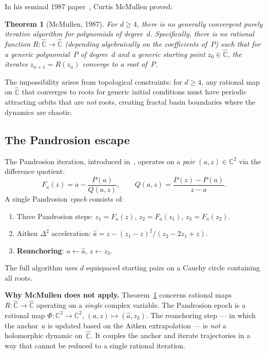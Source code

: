 \documentclass[10pt,a4paper,oneside]{book}
\newtheorem{theorem}{Theorem}[chapter]
\theoremstyle{definition}
\theoremstyle{remark}
\begin{document}
In his seminal 1987 paper~\cite{McMullen1987}, Curtis McMullen proved:

\begin{theorem}[McMullen, 1987]
\label{thm:mcmullen}
For $d \geq 4$, there is no generally convergent purely iterative algorithm for polynomials of degree~$d$.  Specifically, there is no rational function $R: \hat{\mathbb{C}} \to \hat{\mathbb{C}}$ (depending algebraically on the coefficients of~$P$) such that for a generic polynomial~$P$ of degree~$d$ and a generic starting point $z_0 \in \hat{\mathbb{C}}$, the iterates $z_{n+1} = R(z_n)$ converge to a root of~$P$.
\end{theorem}

The impossibility arises from topological constraints: for $d \geq 4$, any rational map on $\hat{\mathbb{C}}$ that converges to roots for generic initial conditions must have periodic attracting orbits that are \emph{not} roots, creating fractal basin boundaries where the dynamics are chaotic.

\subsection{The Pandrosion escape}

The Pandrosion iteration, introduced in~\cite{Besevic2026a}, operates on a \emph{pair} $(a, z) \in \mathbb{C}^2$ via the difference quotient:
\[
F_a(z) = a - \frac{P(a)}{Q(a, z)}, \qquad Q(a, z) = \frac{P(z) - P(a)}{z - a}.
\]
A single Pandrosion \emph{epoch} consists of:
\begin{enumerate}[nosep]
\item Three Pandrosion steps: $z_1 = F_a(z)$, $z_2 = F_a(z_1)$, $z_3 = F_a(z_2)$.
\item Aitken $\Delta^2$ acceleration: $\hat{a} = z - (z_1 - z)^2 / (z_2 - 2z_1 + z)$.
\item \textbf{Reanchoring}: $a \leftarrow \hat{a}$, $z \leftarrow z_3$.
\end{enumerate}
The full algorithm uses $d$ equispaced starting pairs on a Cauchy circle containing all roots.

\medskip
\noindent\textbf{Why McMullen does not apply.}  Theorem~\ref{thm:mcmullen} concerns rational maps $R: \hat{\mathbb{C}} \to \hat{\mathbb{C}}$ operating on a \emph{single} complex variable.  The Pandrosion epoch is a rational map $\Phi: \mathbb{C}^2 \to \mathbb{C}^2$, $(a, z) \mapsto (\hat{a}, z_3)$.  The reanchoring step --- in which the anchor~$a$ is updated based on the Aitken extrapolation --- is \emph{not} a holomorphic dynamic on~$\hat{\mathbb{C}}$.  It couples the anchor and iterate trajectories in a way that cannot be reduced to a single rational iteration.
\end{document}

